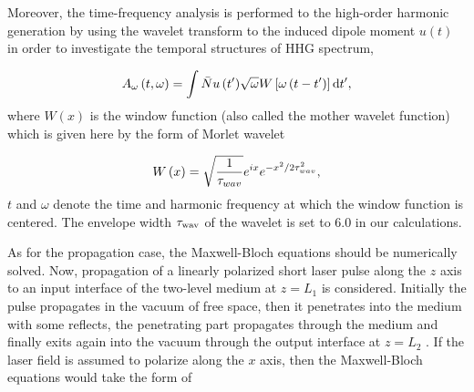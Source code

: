 \documentclass[10pt,letterpaper]{article}
\begin{document}
Moreover, the time-frequency analysis is performed to the high-order harmonic generation by using the wavelet transform to the induced dipole moment ${u}\left( t \right)$ in order to investigate the temporal structures of HHG spectrum,

\begin{equation}
{A_\omega }\left( {t,\omega } \right) = \int {\bar{N}{u}\left( {t'} \right)} \sqrt \omega  {W}\left[ {\omega \left( {t - t'} \right)} \right]{\rm{d}}t',
\label{eq8}
\end{equation}
where  $ {W}(x) $ is the window function (also called the mother wavelet function) which is given here by the form of Morlet wavelet \cite{CuiNi2010NJP-wavelet,MyOE2013,MyOE2015,TongXiaoMin2000PRA-Wavelet}

\begin{equation}
{{W}}\left( x \right) = \sqrt {\frac{{\rm{1}}}{{{\tau _{wav}}}}} {e^{ix}}{e^{ - {x^2}/2\tau _{wav}^2}},
\label{eq9}
\end{equation}
$ t $ and $ \omega $ denote the time and harmonic frequency at which the window function is centered. The envelope width $ \tau_{\rm{wav}} $ of the wavelet is set to 6.0 in our calculations.

As for the propagation case, the Maxwell-Bloch equations should be numerically solved. Now, propagation of a linearly polarized short laser pulse along the $ z $ axis to an input interface of the two-level medium at $ z=L_{1} $ is considered. Initially the pulse propagates in the vacuum of free space, then it penetrates into the medium with some reflects, the penetrating part propagates through the medium and finally exits again into the vacuum through the output interface at $ z=L_{2} $ \cite{Kalosha-Two-Level-PRL-1999}. If the laser field is assumed to polarize along  the $ x $ axis, then the Maxwell-Bloch equations would take the form of
\end{document}
